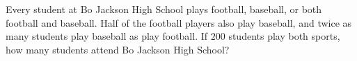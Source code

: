 Every student at Bo Jackson High School plays football, baseball, or both football and baseball. Half of the football players also play baseball, and twice as many students play baseball as play football. If $200$ students play both sports, how many students attend Bo Jackson High School?

